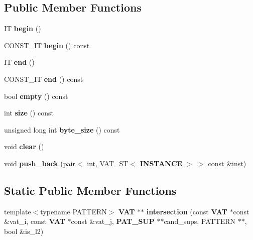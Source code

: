 \subsection*{Public Member Functions}
\begin{CompactItemize}
\item 
IT {\bf begin} ()\label{classvat_3_01SEQ__PROP_00_01V__Fkk__EMB__MINE__PROP_00_01VAT__ST_01_4_a0}

\item 
CONST\_\-IT {\bf begin} () const \label{classvat_3_01SEQ__PROP_00_01V__Fkk__EMB__MINE__PROP_00_01VAT__ST_01_4_a1}

\item 
IT {\bf end} ()\label{classvat_3_01SEQ__PROP_00_01V__Fkk__EMB__MINE__PROP_00_01VAT__ST_01_4_a2}

\item 
CONST\_\-IT {\bf end} () const \label{classvat_3_01SEQ__PROP_00_01V__Fkk__EMB__MINE__PROP_00_01VAT__ST_01_4_a3}

\item 
bool {\bf empty} () const \label{classvat_3_01SEQ__PROP_00_01V__Fkk__EMB__MINE__PROP_00_01VAT__ST_01_4_a4}

\item 
int {\bf size} () const \label{classvat_3_01SEQ__PROP_00_01V__Fkk__EMB__MINE__PROP_00_01VAT__ST_01_4_a5}

\item 
unsigned long int {\bf byte\_\-size} () const \label{classvat_3_01SEQ__PROP_00_01V__Fkk__EMB__MINE__PROP_00_01VAT__ST_01_4_a6}

\item 
void {\bf clear} ()\label{classvat_3_01SEQ__PROP_00_01V__Fkk__EMB__MINE__PROP_00_01VAT__ST_01_4_a7}

\item 
void {\bf push\_\-back} (pair$<$ int, VAT\_\-ST$<$ {\bf INSTANCE} $>$ $>$ const \&inst)\label{classvat_3_01SEQ__PROP_00_01V__Fkk__EMB__MINE__PROP_00_01VAT__ST_01_4_a8}

\end{CompactItemize}
\subsection*{Static Public Member Functions}
\begin{CompactItemize}
\item 
template$<$typename PATTERN$>$ {\bf VAT} $\ast$$\ast$ {\bf intersection} (const  {\bf VAT} $\ast$const \&vat\_\-i, const  {\bf VAT} $\ast$const \&vat\_\-j, {\bf PAT\_\-SUP} $\ast$$\ast$cand\_\-sups, PATTERN $\ast$$\ast$, bool \&is\_\-l2)
\end{CompactItemize}


